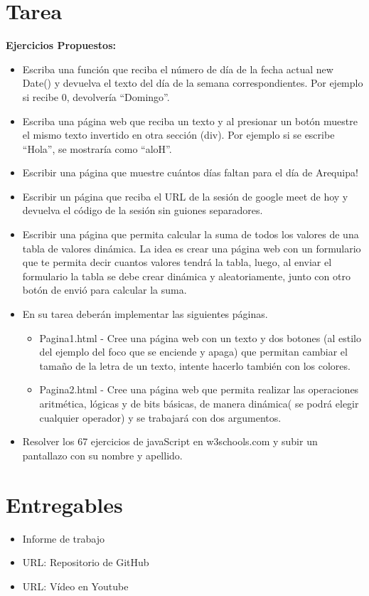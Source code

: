 \documentclass{article}
\begin{document}
 
	\section{Tarea}
	\textbf{Ejercicios Propuestos:}
	\begin{itemize}		
		\item Escriba una función que reciba el número de día de la fecha actual new Date()  y devuelva el texto del día de la semana correspondientes. Por ejemplo si recibe 0, devolvería “Domingo”.
        \item Escriba una página web que reciba un texto y al presionar un botón muestre el mismo texto invertido en otra sección (div). Por ejemplo si se escribe “Hola”, se mostraría como “aloH”.
        \item Escribir una página que muestre cuántos días faltan para el día de Arequipa!
        \item Escribir un página que reciba el URL de la sesión de google meet de hoy y devuelva el código de la sesión sin guiones separadores.
        \item Escribir una página que permita calcular la suma de todos los valores de una tabla de valores dinámica. La idea es crear una página web con un formulario que te permita decir cuantos valores tendrá la tabla, luego, al enviar el formulario la tabla se debe crear dinámica y aleatoriamente, junto con otro botón de envió para calcular la suma.
        \item En su tarea deberán implementar las siguientes páginas.
        \begin{itemize}
        	\item Pagina1.html - Cree una página web con un texto y dos botones (al estilo del ejemplo del foco que se enciende y apaga) que permitan cambiar el tamaño de la letra de un texto, intente hacerlo también con los colores.
        	\item Pagina2.html - Cree una página web que permita realizar las operaciones aritmética, lógicas y de bits básicas, de manera dinámica( se podrá elegir cualquier operador) y se trabajará con dos argumentos.
        \end{itemize}
        \item Resolver los 67 ejercicios de javaScript en w3schools.com y subir un pantallazo con su nombre y apellido.
	\end{itemize}
 
    \section{Entregables}
    \begin{itemize}
        \item Informe de trabajo
        \item URL: Repositorio de GitHub
        \item URL: Vídeo en Youtube
    \end{itemize}
    
\end{document}
